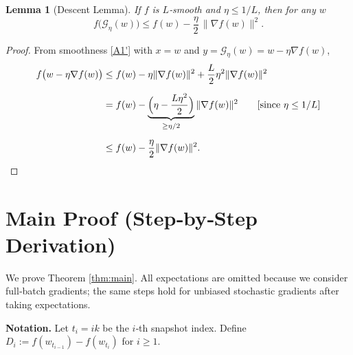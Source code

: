 \documentclass{article}
\newtheorem{lemma}{Lemma}
\begin{document}
\begin{lemma}[Descent Lemma]\label{lem:descent}
If $f$ is $L$‑smooth and $\eta\le 1/L$, then for any $w$
\[
f\bigl(\mathcal{G}_{\eta}(w)\bigr)\le
f(w)-\frac{\eta}{2}\,\|\nabla f(w)\|^{2}.
\tag{8}
\]
\end{lemma}
\begin{proof}
From smoothness \eqref{A1'} with $x=w$ and $y=\mathcal{G}_{\eta}(w)=w-\eta\nabla f(w)$,
\[
\begin{aligned}
f\bigl(w-\eta\nabla f(w)\bigr)
&\le f(w)-\eta\|\nabla f(w)\|^{2}
+\frac{L}{2}\eta^{2}\|\nabla f(w)\|^{2}\\[2mm]
&=f(w)-\underbrace{\Bigl(\eta-\frac{L\eta^{2}}{2}\Bigr)}_{\ge\eta/2}
\|\nabla f(w)\|^{2} \qquad\text{[since }\eta\le 1/L\text{]}\\[2mm]
&\le f(w)-\frac{\eta}{2}\|\nabla f(w)\|^{2}.
\end{aligned}
\]
\end{proof}

\section*{Main Proof (Step‑by‑Step Derivation)}
We prove Theorem \ref{thm:main}.  All expectations are omitted because we
consider full‑batch gradients; the same steps hold for unbiased stochastic
gradients after taking expectations.

\noindent\textbf{Notation.}
Let $t_{i}=i k$ be the $i$‑th snapshot index.
Define $D_{i}:=f(w_{t_{i-1}})-f(w_{t_{i}})$ for $i\ge1$.
\end{document}
